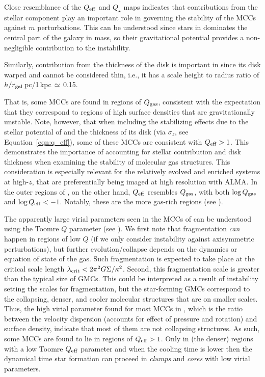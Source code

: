 \IfFileExists{emulateapjlegacy.cls}{\documentclass[iop]{emulateapjlegacy}}{\documentclass[iop]{emulateapj}}
\begin{document}
Close resemblance of the $Q_{\rm eff}$ and $Q_{\star}$ maps indicates that contributions from the stellar component play an important role in governing the stability of the MCCs against $m$ perturbations. This can be understood since stars in \flower dominates the central part of the galaxy in mass, so their gravitational potential provides a non-negligible contribution to the instability.

Similarly, contribution from the thickness of the disk is important in \flower since its disk warped and cannot be considered thin, i.e., 
it has a scale height to radius ratio of $h/r_{\rm gal}$\,pc/1\,kpc\,$\simeq$\,0.15.

That is, some MCCs are found in regions of $Q_{\rm gas}$, consistent with the expectation that they correspond to regions of high surface densities that are gravitationally unstable. 
Note, however, that when including the stabilizing effects due to the stellar potential of \flower and the
thickness of its disk (via $\sigma_z$, see Equation~\ref{eqn:q_eff}), some of these MCCs are
consistent with  $Q_{\rm eff} > 1$. 
This demonstrates the importance of accounting for stellar contribution and disk thickness 
when examining the stability of molecular gas structures.
This consideration is especially relevant for the relatively evolved and enriched systems at high-$z$, 
that are preferentially being imaged at high resolution with ALMA.
In the outer regions of \flower, on the other hand, $Q_{\rm eff}$ resembles $Q_{\rm gas}$, with 
both $\log{Q_{\rm gas}}$ and $\log{Q_{\rm eff}} < -1$. 
Notably, these are the more gas-rich regions (see ).

The apparently large virial parameters seen in the MCCs of \flower can be understood using the Toomre $Q$ parameter (see ). We first note that fragmentation {\it can} happen in regions of low $Q$ (if we only consider instability against axisymmetric perturbations), but further evolution/collapse depends on the dynamics or equation of state of the gas.
%
Such fragmentation is expected to take place at the critical scale length $\lambda_{\rm crit} < 2 \pi^2 G \Sigma / \kappa^2$. Second, this fragmentation scale is greater than the typical size of GMCs. This could be interpreted as a result of instability setting the scales for fragmentation, but the star-forming GMCs correspond to the collapsing, denser, and cooler molecular structures that are on smaller scales.
%
Thus, the high virial parameter found for most MCCs in \flower, which is the ratio between the velocity dispersion (accounts for effect of pressure and rotation) and surface density, indicate that most of them are not collapsing structures. As such, 
some MCCs are found to lie in regions of $Q_{\rm eff}>1$.
Only in (the denser) regions with a low Toomre $Q_{\rm eff}$ parameter and when the cooling time is lower then the dynamical time star formation can proceed in {\it clumps} and {\it cores} with low virial parameters.
\end{document}
